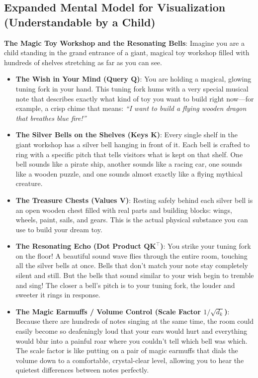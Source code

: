 \documentclass[11pt,a4paper]{article}
\theoremstyle{definition}
\begin{document}
\subsection{Expanded Mental Model for Visualization (Understandable by a Child)}
\textbf{The Magic Toy Workshop and the Resonating Bells}:
Imagine you are a child standing in the grand entrance of a giant, magical toy workshop filled with hundreds of shelves stretching as far as you can see.

\begin{itemize}
    \item \textbf{The Wish in Your Mind (Query $\mathbf{Q}$)}:
    You are holding a magical, glowing tuning fork in your hand. This tuning fork hums with a very special musical note that describes exactly what kind of toy you want to build right now—for example, a crisp chime that means: \emph{``I want to build a flying wooden dragon that breathes blue fire!''}
    
    \item \textbf{The Silver Bells on the Shelves (Keys $\mathbf{K}$)}:
    Every single shelf in the giant workshop has a silver bell hanging in front of it. Each bell is crafted to ring with a specific pitch that tells visitors what is kept on that shelf. One bell sounds like a pirate ship, another sounds like a racing car, one sounds like a wooden puzzle, and one sounds almost exactly like a flying mythical creature.
    
    \item \textbf{The Treasure Chests (Values $\mathbf{V}$)}:
    Resting safely behind each silver bell is an open wooden chest filled with real parts and building blocks: wings, wheels, paint, sails, and gears. This is the actual physical substance you can use to build your dream toy.
    
    \item \textbf{The Resonating Echo (Dot Product $\mathbf{Q}\mathbf{K}^\top$)}:
    You strike your tuning fork on the floor! A beautiful sound wave flies through the entire room, touching all the silver bells at once. Bells that don't match your note stay completely silent and still. But the bells that sound similar to your wish begin to tremble and sing! The closer a bell's pitch is to your tuning fork, the louder and sweeter it rings in response.
    
    \item \textbf{The Magic Earmuffs / Volume Control (Scale Factor $1/\sqrt{d_k}$)}:
    Because there are hundreds of notes singing at the same time, the room could easily become so deafeningly loud that your ears would hurt and everything would blur into a painful roar where you couldn't tell which bell was which. The scale factor is like putting on a pair of magic earmuffs that dials the volume down to a comfortable, crystal-clear level, allowing you to hear the quietest differences between notes perfectly.
    

\end{itemize}
\end{document}
